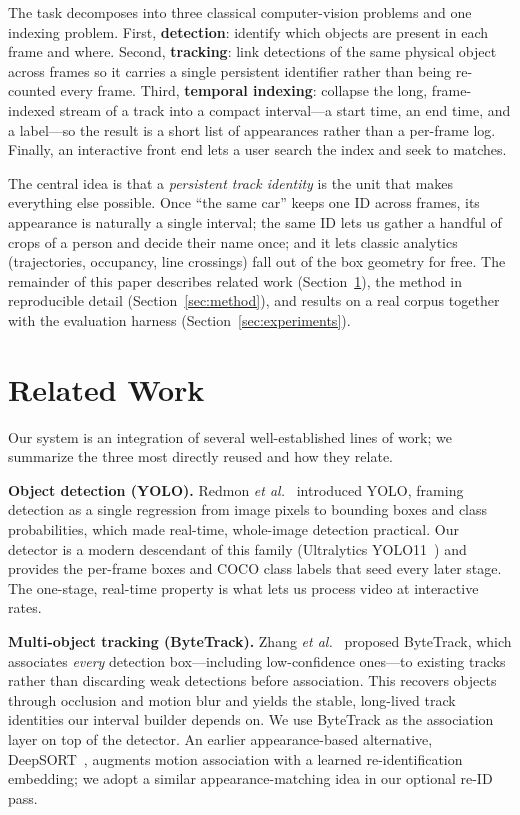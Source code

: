 \documentclass[conference]{IEEEtran}
\begin{document}
The task decomposes into three classical computer-vision problems and
one indexing problem. First, \textbf{detection}: identify which objects
are present in each frame and where. Second, \textbf{tracking}: link
detections of the same physical object across frames so it carries a
single persistent identifier rather than being re-counted every frame.
Third, \textbf{temporal indexing}: collapse the long, frame-indexed
stream of a track into a compact interval---a start time, an end time,
and a label---so the result is a short list of appearances rather than
a per-frame log. Finally, an interactive front end lets a user search
the index and seek to matches.

The central idea is that a \emph{persistent track identity} is the unit
that makes everything else possible. Once ``the same car'' keeps one ID
across frames, its appearance is naturally a single interval; the same
ID lets us gather a handful of crops of a person and decide their name
once; and it lets classic analytics (trajectories, occupancy, line
crossings) fall out of the box geometry for free. The remainder of this
paper describes related work (Section~\ref{sec:related}), the method in
reproducible detail (Section~\ref{sec:method}), and results on a real
corpus together with the evaluation harness
(Section~\ref{sec:experiments}).

\section{Related Work}
\label{sec:related}
Our system is an integration of several well-established lines of work;
we summarize the three most directly reused and how they relate.

\textbf{Object detection (YOLO).} Redmon \emph{et al.}~\cite{yolo}
introduced YOLO, framing detection as a single regression from image
pixels to bounding boxes and class probabilities, which made real-time,
whole-image detection practical. Our detector is a modern descendant of
this family (Ultralytics YOLO11~\cite{ultralytics}) and provides the
per-frame boxes and COCO class labels that seed every later stage. The
one-stage, real-time property is what lets us process video at
interactive rates.

\textbf{Multi-object tracking (ByteTrack).} Zhang \emph{et
al.}~\cite{bytetrack} proposed ByteTrack, which associates \emph{every}
detection box---including low-confidence ones---to existing tracks
rather than discarding weak detections before association. This
recovers objects through occlusion and motion blur and yields the
stable, long-lived track identities our interval builder depends on. We
use ByteTrack as the association layer on top of the detector. An
earlier appearance-based alternative, DeepSORT~\cite{deepsort}, augments
motion association with a learned re-identification embedding; we adopt
a similar appearance-matching idea in our optional re-ID pass.
\end{document}
